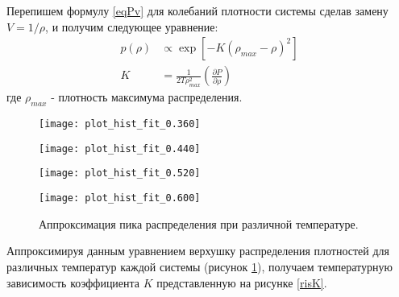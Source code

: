 Перепишем формулу \ref{eqPv} для колебаний плотности системы сделав замену $V = 1 / \rho$, и получим следующее уравнение:
\begin{equation}
\begin{aligned}
p(\rho) &\varpropto \exp \left[ - K \left(\rho_{max}- \rho \right)^2 \right] \\
K &= \frac{1}{2T\rho_{max}^2} \left( \frac{\partial P}{\partial \rho} \right)
\end{aligned}
\label{eqFitRho}
\end{equation}
где $\rho_{max}$ - плотность максимума распределения.


\begin{figure}[htbp!]
\begin{center}
\begin{minipage}[h]{0.45\linewidth}
\texttt{[image: plot\_hist\_fit\_0.360]}
\end{minipage}
\begin{minipage}[h]{0.45\linewidth}
\texttt{[image: plot\_hist\_fit\_0.440]}
\end{minipage}

\begin{minipage}[h]{0.45\linewidth}
\texttt{[image: plot\_hist\_fit\_0.520]}
\end{minipage}
\begin{minipage}[h]{0.45\linewidth}
\texttt{[image: plot\_hist\_fit\_0.600]}
\end{minipage}
\caption{Аппроксимация пика распределения при различной температуре.}
\label{risHistFit}
\end{center}
\end{figure}

Аппроксимируя данным уравнением верхушку распределения плотностей для различных температур каждой системы (рисунок \ref{risHistFit}), получаем температурную зависимость коэффициента $K$ представленную на рисунке \ref{risK}.


